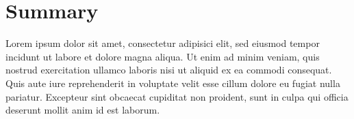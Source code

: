 \documentclass[a4paper,oneside,titlepage]{report}
\begin{document}





\setcounter{page}{2}
\chapter*{Summary}
\label{chap:sum}

Lorem ipsum dolor sit amet, consectetur adipisici elit, sed eiusmod tempor incidunt ut labore et dolore magna aliqua. Ut enim ad minim veniam, quis nostrud exercitation ullamco laboris nisi ut aliquid ex ea commodi consequat. Quis aute iure reprehenderit in voluptate velit esse cillum dolore eu fugiat nulla pariatur. Excepteur sint obcaecat cupiditat non proident, sunt in culpa qui officia deserunt mollit anim id est laborum.

\pagestyle{short}

%

\newpage
\tableofcontents %


\newpage



\pagestyle{long}

\cleardoublepage










%
\end{document}
